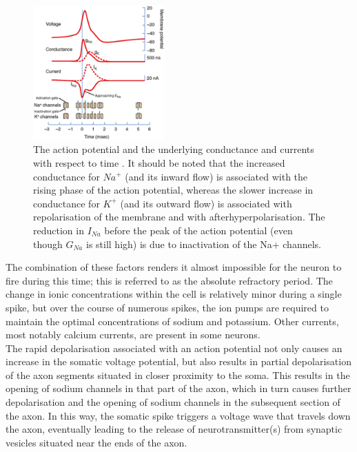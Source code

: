 \begin{figure}[htbp!] 
    \centering    
    \includegraphics[width=0.45\textwidth]{Chapter1/Figs/1b.png}
    \caption[Spiking dynamics of a neuron.]{The action potential and the underlying conductance and currents with respect to time \cite{squire2012fundamental}. It should be noted that the increased conductance for $Na^+$ (and its inward flow) is associated with the rising phase of the action potential, whereas the slower increase in conductance for $K^+$ (and its outward flow) is associated with repolarisation of the membrane and with afterhyperpolarisation. The reduction in $I_{Na}$ before the peak of the action potential (even though $G_{Na}$ is still high) is due to inactivation of the Na+ channels.}
    \label{fig:1b}
\end{figure}

\noindent The combination of these factors renders it almost impossible for the neuron to fire during this time; this is referred to as the absolute refractory period. The change in ionic concentrations within the cell is relatively minor during a single spike, but over the course of numerous spikes, the ion pumps are required to maintain the optimal concentrations of sodium and potassium. Other currents, most notably calcium currents, are present in some neurons. \\

\noindent The rapid depolarisation associated with an action potential not only causes an increase in the somatic voltage potential, but also results in partial depolarisation of the axon segments situated in closer proximity to the soma. This results in the opening of sodium channels in that part of the axon, which in turn causes further depolarisation and the opening of sodium channels in the subsequent section of the axon. In this way, the somatic spike triggers a voltage wave that travels down the axon, eventually leading to the release of neurotransmitter(s) from synaptic vesicles situated near the ends of the axon. \\


